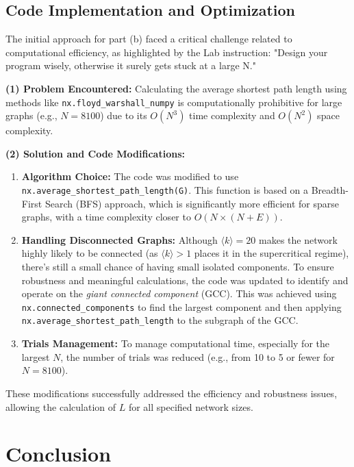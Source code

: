 \documentclass[11pt,a4paper]{article} %
\begin{document}
\subsection{Code Implementation and Optimization}
\indent

The initial approach for part (b) faced a critical challenge related to computational efficiency, as highlighted by the Lab instruction: "Design your program wisely, otherwise it surely gets stuck at a large N."

\textbf{(1) Problem Encountered:} Calculating the average shortest path length using methods like \texttt{nx.floyd\_warshall\_numpy} is computationally prohibitive for large graphs (e.g., $N=8100$) due to its $O(N^3)$ time complexity and $O(N^2)$ space complexity.

\textbf{(2) Solution and Code Modifications:}
\begin{enumerate}
    \item \textbf{Algorithm Choice:} The code was modified to use \texttt{nx.average\_shortest\_path\_length(G)}. This function is based on a Breadth-First Search (BFS) approach, which is significantly more efficient for sparse graphs, with a time complexity closer to $O(N \times (N + E))$.
    \item \textbf{Handling Disconnected Graphs:} Although $\langle k \rangle = 20$ makes the network highly likely to be connected (as $\langle k \rangle > 1$ places it in the supercritical regime), there's still a small chance of having small isolated components. To ensure robustness and meaningful calculations, the code was updated to identify and operate on the \textit{giant connected component} (GCC). This was achieved using \texttt{nx.connected\_components} to find the largest component and then applying \texttt{nx.average\_shortest\_path\_length} to the subgraph of the GCC.
    \item \textbf{Trials Management:} To manage computational time, especially for the largest $N$, the number of trials was reduced (e.g., from 10 to 5 or fewer for $N=8100$).
\end{enumerate}

These modifications successfully addressed the efficiency and robustness issues, allowing the calculation of $L$ for all specified network sizes.

\section{Conclusion}
\indent
\end{document}
